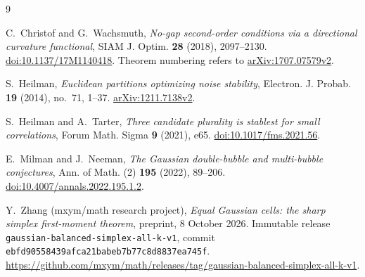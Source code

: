 \documentclass[11pt,reqno]{amsart}
\theoremstyle{remark}
\begin{document}
\begin{thebibliography}{9}
\raggedright
{}
C.~Christof and G.~Wachsmuth,
\emph{No-gap second-order conditions via a directional curvature functional},
SIAM J. Optim. \textbf{28} (2018), 2097--2130.
\href{https://doi.org/10.1137/17M1140418}{doi:10.1137/17M1140418}.
Theorem numbering refers to \href{https://arxiv.org/abs/1707.07579v2}{arXiv:1707.07579v2}.

S.~Heilman, \emph{Euclidean partitions optimizing noise stability},
Electron. J. Probab. \textbf{19} (2014), no.~71, 1--37.
\href{https://arxiv.org/abs/1211.7138v2}{arXiv:1211.7138v2}.

S.~Heilman and A.~Tarter,
\emph{Three candidate plurality is stablest for small correlations},
Forum Math. Sigma \textbf{9} (2021), e65.
\href{https://doi.org/10.1017/fms.2021.56}{doi:10.1017/fms.2021.56}.

E.~Milman and J.~Neeman,
\emph{The Gaussian double-bubble and multi-bubble conjectures},
Ann. of Math. (2) \textbf{195} (2022), 89--206.
\href{https://doi.org/10.4007/annals.2022.195.1.2}{doi:10.4007/annals.2022.195.1.2}.

Y.~Zhang (mxym/math research project),
\emph{Equal Gaussian cells: the sharp simplex first-moment theorem},
preprint, 8 October 2026.
Immutable release \texttt{gaussian-balanced-simplex-all-k-v1},
commit \texttt{ebfd90558439afca21babeb7b77c8d8837ea745f}.
\url{https://github.com/mxym/math/releases/tag/gaussian-balanced-simplex-all-k-v1}.
\end{thebibliography}
\end{document}
